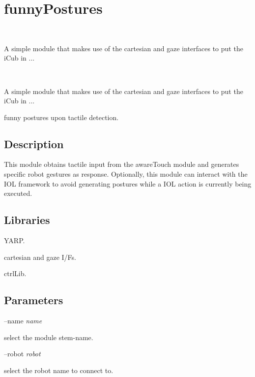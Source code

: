 \section{funny\+Postures}
\label{group__icub__funnyPostures}


~\newline


A simple module that makes use of the cartesian and gaze interfaces to put the i\+Cub in ...  


~\newline


A simple module that makes use of the cartesian and gaze interfaces to put the i\+Cub in ... 

funny postures upon tactile detection.\hypertarget{group__icub__iCubWriter_intro_sec}{}\subsection{Description}\label{group__icub__iCubWriter_intro_sec}
This module obtains tactile input from the aware\+Touch module and generates specific robot gestures as response. Optionally, this module can interact with the I\+OL framework to avoid generating postures while a I\+OL action is currently being executed.\hypertarget{group__icub__iCubWriter_lib_sec}{}\subsection{Libraries}\label{group__icub__iCubWriter_lib_sec}

\begin{DoxyItemize}
\item Y\+A\+RP.
\item cartesian and gaze I/F\textquotesingle{}s.
\item ctrl\+Lib.
\end{DoxyItemize}\hypertarget{group__icub__iCubWriter_parameters_sec}{}\subsection{Parameters}\label{group__icub__iCubWriter_parameters_sec}
--name {\itshape name} 
\begin{DoxyItemize}
\item select the module stem-\/name.
\end{DoxyItemize}

--robot {\itshape robot} 
\begin{DoxyItemize}
\item select the robot name to connect to.
\end{DoxyItemize}

